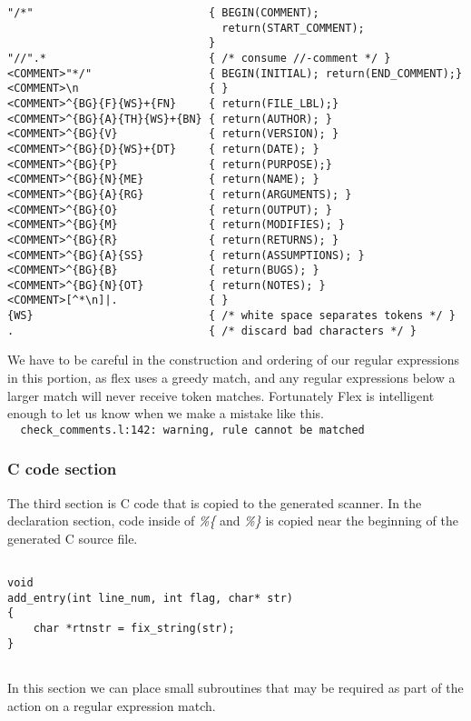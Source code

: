 \begingroup
    \fontsize{8pt}{8pt}\selectfont
\begin{verbatim}
"/*"                           { BEGIN(COMMENT); 
                                 return(START_COMMENT); 
                               }
"//".*                         { /* consume //-comment */ }
<COMMENT>"*/"                  { BEGIN(INITIAL); return(END_COMMENT);}
<COMMENT>\n                    { }
<COMMENT>^{BG}{F}{WS}+{FN}     { return(FILE_LBL);}
<COMMENT>^{BG}{A}{TH}{WS}+{BN} { return(AUTHOR); }
<COMMENT>^{BG}{V}              { return(VERSION); }
<COMMENT>^{BG}{D}{WS}+{DT}     { return(DATE); }
<COMMENT>^{BG}{P}              { return(PURPOSE);}
<COMMENT>^{BG}{N}{ME}          { return(NAME); }
<COMMENT>^{BG}{A}{RG}          { return(ARGUMENTS); }
<COMMENT>^{BG}{O}              { return(OUTPUT); }
<COMMENT>^{BG}{M}              { return(MODIFIES); }
<COMMENT>^{BG}{R}              { return(RETURNS); }
<COMMENT>^{BG}{A}{SS}          { return(ASSUMPTIONS); }
<COMMENT>^{BG}{B}              { return(BUGS); }
<COMMENT>^{BG}{N}{OT}          { return(NOTES); }
<COMMENT>[^*\n]|.              { }
{WS}                           { /* white space separates tokens */ }
.                              { /* discard bad characters */ }
\end{verbatim}
\endgroup

\noindent We have to be careful in the construction and ordering of our regular 
expressions in this portion, as flex uses a greedy match, and any regular 
expressions below a larger match will never receive token matches. Fortunately 
Flex is intelligent enough to let us know when we make a mistake like this.\\
\verb|  check_comments.l:142: warning, rule cannot be matched|

\subsubsection{C code section}
\noindent The third section is C code that is copied to the generated scanner.
In the declaration section, code inside of \emph{\%\{} and \emph{\%\}} is copied near the 
beginning of the generated C source file. 
\begingroup
    \fontsize{8pt}{8pt}\selectfont
\begin{verbatim}

void
add_entry(int line_num, int flag, char* str)
{
    char *rtnstr = fix_string(str);
}


\end{verbatim}
\endgroup
\noindent In this section we can place small subroutines that may be required
as part of the action on a regular expression match.\\

